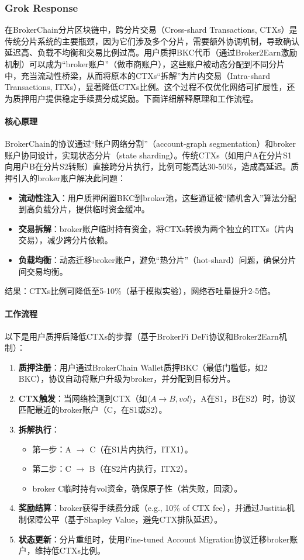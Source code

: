 \documentclass[a4paper,12pt]{ctexart}
\begin{document}
\subsubsection*{Grok Response}
在BrokerChain分片区块链中，跨分片交易（Cross-shard Transactions, CTXs）是传统分片系统的主要瓶颈，因为它们涉及多个分片，需要额外协调机制，导致确认延迟高、负载不均衡和交易比例过高。用户质押BKC代币（通过Broker2Earn激励机制）可以成为“broker账户”（做市商账户），这些账户被动态分配到不同分片中，充当流动性桥梁，从而将原本的CTXs“拆解”为片内交易（Intra-shard Transactions, ITXs），显著降低CTXs比例。这个过程不仅优化网络可扩展性，还为质押用户提供稳定手续费分成奖励。下面详细解释原理和工作流程。

\paragraph{核心原理}
BrokerChain的协议通过“账户网络分割”（account-graph segmentation）和broker账户协同设计，实现状态分片（state sharding）。传统CTXs（如用户A在分片S1向用户B在分片S2转账）直接跨分片执行，比例可能高达30-50\%，造成高延迟。质押引入的broker账户解决此问题：
\begin{itemize}
  \item \textbf{流动性注入}：用户质押闲置BKC到broker池，这些通证被“随机舍入”算法分配到高负载分片，提供临时资金缓冲。
  \item \textbf{交易拆解}：broker账户临时持有资金，将CTXs转换为两个独立的ITXs（片内交易），减少跨分片依赖。
  \item \textbf{负载均衡}：动态迁移broker账户，避免“热分片”（hot-shard）问题，确保分片间交易均衡。
\end{itemize}
结果：CTXs比例可降低至5-10\%（基于模拟实验），网络吞吐量提升2-5倍。

\paragraph{工作流程}
以下是用户质押后降低CTXs的步骤（基于BrokerFi DeFi协议和Broker2Earn机制）：
\begin{enumerate}
  \item \textbf{质押注册}：用户通过BrokerChain Wallet质押BKC（最低门槛低，如2 BKC），协议自动将账户升级为broker，并分配到目标分片。
  \item \textbf{CTX触发}：当网络检测到CTX（如$\langle A \to B, vol \rangle$，A在S1，B在S2）时，协议匹配最近的broker账户（C，在S1或S2）。
  \item \textbf{拆解执行}：
    \begin{itemize}
      \item 第一步：A $\to$ C（在S1片内执行，ITX1）。
      \item 第二步：C $\to$ B（在S2片内执行，ITX2）。
      \item broker C临时持有vol资金，确保原子性（若失败，回滚）。
    \end{itemize}
  \item \textbf{奖励结算}：broker获得手续费分成（e.g., 10\% of CTX fee），并通过Justitia机制保障公平（基于Shapley Value，避免CTX排队延迟）。
  \item \textbf{状态更新}：分片重组时，使用Fine-tuned Account Migration协议迁移broker账户，维持低CTXs比例。
\end{enumerate}
\end{document}
